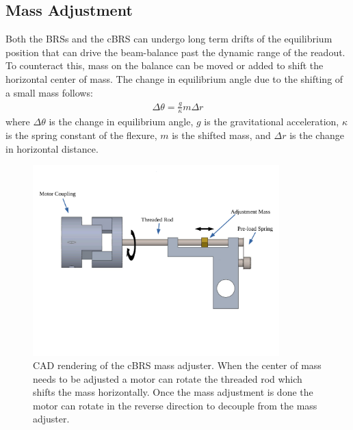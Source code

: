 \documentclass [12pt, proquest]{uwthesis}[2019]
\begin{document}

\subsection{Mass Adjustment}

Both the BRSs and the cBRS can undergo long term drifts of the equilibrium position that can drive the beam-balance past the dynamic range of the readout. To counteract this, mass on the balance can be moved or added to shift the horizontal center of mass. The change in equilibrium angle due to the shifting of a small mass follows:
\begin{align}
\Delta \theta=\frac{g}{\kappa} m \Delta r
\end{align}
where $\Delta \theta$ is the change in equilibrium angle, $g$ is the gravitational acceleration, $\kappa$ is the spring constant of the flexure, $m$ is the shifted mass, and $\Delta r$ is the change in horizontal distance.


\begin{figure}[!h]
\begin{center}
\includegraphics[width=0.85\textwidth]{cBRSMassAdjusterLabeled.pdf}
\end{center}
\caption[CAD rendering of the cBRS mass adjuster]{CAD rendering of the cBRS mass adjuster. When the center of mass needs to be adjusted a motor can rotate the threaded rod which shifts the mass horizontally. Once the mass adjustment is done the motor can rotate in the reverse direction to decouple from the mass adjuster.}\label{massAdjust}
\end{figure}
\end{document}
